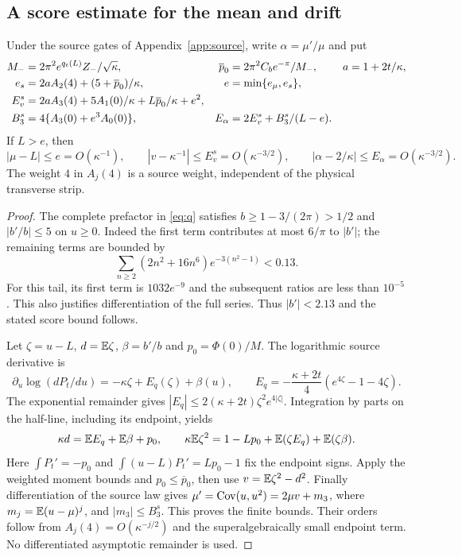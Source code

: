 \subsection{A score estimate for the mean and drift}
\begin{lemma}\label{lem:score}
Under the source gates of Appendix~\ref{app:source}, write
$\alpha=\mu'/\mu$ and put
\begin{align}
 M_-&=2\pi^2e^{q_t(L)}Z_-/\sqrt\kappa,&
 \overline p_0&=2\pi^2C_be^{-\pi}/M_-,& a&=1+2t/\kappa,\notag\\
 e_s&=2aA_2(4)+(5+\overline p_0)/\kappa,&
 e&=\min\{e_\mu,e_s\},\notag\\
 E_v^s&=2aA_3(4)+5A_1(0)/\kappa
                   +L\overline p_0/\kappa+e^2,\notag\\
 B_3^s&=4\{A_3(0)+e^3A_0(0)\},&
 E_\alpha&=2E_v^s+B_3^s/(L-e).\label{eq:scoreallowances}
\end{align}
If $L>e$, then
\begin{equation}
 |\mu-L|\le e=O(\kappa^{-1}),\qquad
 |v-\kappa^{-1}|\le E_v^s=O(\kappa^{-3/2}),\qquad
 |\alpha-2/\kappa|\le E_\alpha=O(\kappa^{-3/2}).
 \label{eq:scorebounds}
\end{equation}
The weight $4$ in $A_j(4)$ is a source weight, independent of the
physical transverse strip.
\end{lemma}
\begin{proof}
The complete prefactor in \eqref{eq:q} satisfies
$b\ge1-3/(2\pi)>1/2$ and $|b'/b|\le5$ on $u\ge0$.
Indeed the first term contributes at most $6/\pi$ to $|b'|$;
the remaining terms are bounded by
\[
 \sum_{n\ge2}(2n^2+16n^6)e^{-3(n^2-1)}<0.13.
\]
For this tail, its first term is $1032e^{-9}$ and the subsequent
ratios are less than $10^{-5}$. This also justifies differentiation
of the full series. Thus $|b'|<2.13$ and the stated score bound follows.

Let $\zeta=u-L$, $d=\mathbb E\zeta$, $\beta=b'/b$ and
$p_0=\Phi(0)/M$. The logarithmic source derivative is
\begin{equation}
 \partial_u\log(dP_t/du)=-\kappa\zeta+E_q(\zeta)+\beta(u),
 \qquad E_q=-\frac{\kappa+2t}{4}(e^{4\zeta}-1-4\zeta).
 \label{eq:scoreidentity}
\end{equation}
The exponential remainder gives
$|E_q|\le2(\kappa+2t)\zeta^2e^{4|\zeta|}$.
Integration by parts on the half-line, including its endpoint, yields
\begin{equation}
 \kappa d=\mathbb E E_q+\mathbb E\beta+p_0,\qquad
 \kappa\mathbb E\zeta^2=1-Lp_0+\mathbb E(\zeta E_q)+\mathbb E(\zeta\beta).
 \label{eq:scoreparts}
\end{equation}
Here $\int P_t'=-p_0$ and
$\int(u-L)P_t'=Lp_0-1$ fix the endpoint signs.
Apply the weighted moment bounds and $p_0\le\overline p_0$,
then use $v=\mathbb E\zeta^2-d^2$.
Finally differentiation of the source law gives
$\mu'=\operatorname{Cov}(u,u^2)=2\mu v+m_3$, where
$m_j=\mathbb E(u-\mu)^j$, and $|m_3|\le B_3^s$.
This proves the finite bounds. Their orders follow from
$A_j(4)=O(\kappa^{-j/2})$ and the superalgebraically small endpoint term.
No differentiated asymptotic remainder is used.
\end{proof}

